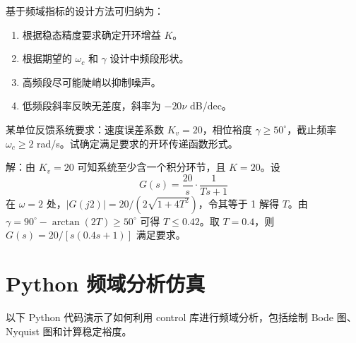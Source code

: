 基于频域指标的设计方法可归纳为：
\begin{enumerate}
    \item 根据稳态精度要求确定开环增益 $K$。
    \item 根据期望的 $\omega_c$ 和 $\gamma$ 设计中频段形状。
    \item 高频段尽可能陡峭以抑制噪声。
    \item 低频段斜率反映无差度，斜率为 $-20\nu$ dB/dec。
\end{enumerate}

\begin{example}
某单位反馈系统要求：速度误差系数 $K_v = 20$，相位裕度 $\gamma \geq 50^{\circ}$，截止频率 $\omega_c \geq 2$ rad/s。试确定满足要求的开环传递函数形式。

解：由 $K_v=20$ 可知系统至少含一个积分环节，且 $K=20$。设
\[
G(s) = \frac{20}{s}\cdot\frac{1}{Ts+1}
\]
在 $\omega=2$ 处，$|G(j2)| = 20/(2\sqrt{1+4T^2})$，令其等于 1 解得 $T$。由 $\gamma = 90^{\circ} - \arctan(2T) \geq 50^{\circ}$ 可得 $T \leq 0.42$。取 $T=0.4$，则 $G(s) = 20/[s(0.4s+1)]$ 满足要求。
\end{example}

\section{Python 频域分析仿真}

以下 Python 代码演示了如何利用 control 库进行频域分析，包括绘制 Bode 图、Nyquist 图和计算稳定裕度。

